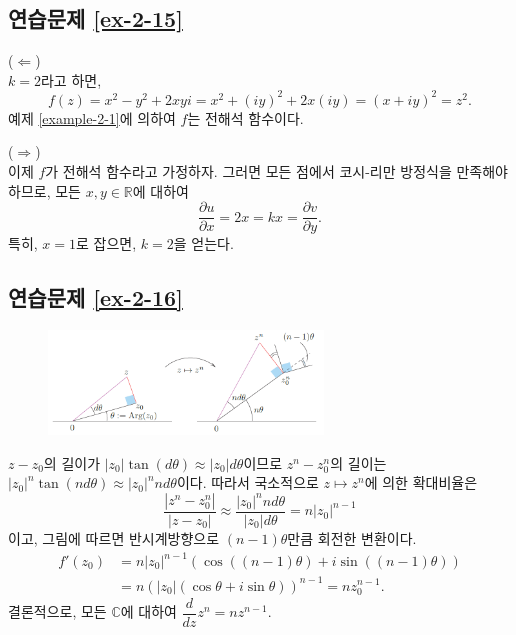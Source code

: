 \subsection*{연습문제 \ref{ex-2-15}}

($\Leftarrow$) \\[1ex]
$k=2$라고 하면,
\[
f(z) = x^2-y^2 + 2xyi = x^2 + (iy)^2 + 2x(iy) = (x+iy)^2 = z^2.
\]
예제 \ref{example-2-1}에 의하여 $f$는 전해석 함수이다.

\noindent($\Rightarrow$) \\[1ex]
이제 $f$가 전해석 함수라고  가정하자.
그러면 모든 점에서 코시-리만 방정식을 만족해야 하므로, 모든 $x, y\in \mathbb R$에 대하여
\[
\dfrac{\partial u}{\partial x} = 2x = kx = \dfrac{\partial v}{\partial y}.
\]
특히, $x=1$로 잡으면, $k=2$을 얻는다.

\subsection*{연습문제 \ref{ex-2-16}}

\begin{figure}[h!]
\begin{center}
\includegraphics[width=0.65\textwidth]{./Solution/figs/fig-s-0-6}
\end{center}
\end{figure}

$z-z_0$의 길이가 $|z_0|\tan(d\theta) \approx |z_0| d\theta$이므로
$z^n-z_0^n$의 길이는 $|z_0|^n\tan(nd\theta) \approx |z_0|^nnd\theta$이다.
따라서 국소적으로 $z\mapsto z^n$에 의한 확대비율은
\[
 \dfrac{|z^n-z_0^n|}{|z-z_0|} \approx \dfrac{|z_0|^n nd\theta}{|z_0|d\theta}
 = n|z_0|^{n-1}
\]
이고, 그림에 따르면 반시계방향으로 $(n-1)\theta$만큼 회전한 변환이다.
\begin{align*}
f'(z_0) &= n|z_0|^{n-1} ( \cos((n-1)\theta) + i\sin((n-1)\theta) ) \\
&= n(|z_0|(\cos\theta + i\sin\theta))^{n-1} = nz_0^{n-1}.
\end{align*}
결론적으로, 모든 $\mathbb C$에 대하여 $\dfrac d{dz} z^n = nz^{n-1}$.



